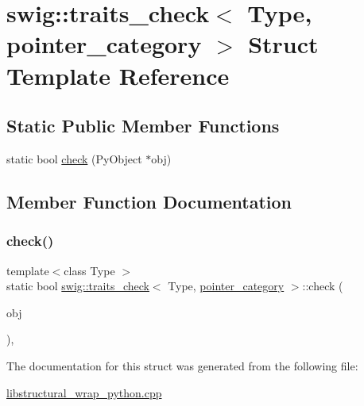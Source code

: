 \hypertarget{structswig_1_1traits__check_3_01_type_00_01pointer__category_01_4}{}\section{swig\+:\+:traits\+\_\+check$<$ Type, pointer\+\_\+category $>$ Struct Template Reference}
\label{structswig_1_1traits__check_3_01_type_00_01pointer__category_01_4}
\subsection*{Static Public Member Functions}
\begin{DoxyCompactItemize}
\item 
static bool \hyperlink{structswig_1_1traits__check_3_01_type_00_01pointer__category_01_4_ae3cc14b7411d171e1cf97aabd9ff92c5}{check} (Py\+Object $\ast$obj)
\end{DoxyCompactItemize}


\subsection{Member Function Documentation}
\mbox{\label{structswig_1_1traits__check_3_01_type_00_01pointer__category_01_4_ae3cc14b7411d171e1cf97aabd9ff92c5}} 
\subsubsection{\texorpdfstring{check()}{check()}}
{\footnotesize\ttfamily template$<$class Type $>$ \\
static bool \hyperlink{structswig_1_1traits__check}{swig\+::traits\+\_\+check}$<$ Type, \hyperlink{structswig_1_1pointer__category}{pointer\+\_\+category} $>$\+::check (\begin{DoxyParamCaption}\item[{Py\+Object $\ast$}]{obj }\end{DoxyParamCaption})\hspace{0.3cm}{\ttfamily [inline]}, {\ttfamily [static]}}



The documentation for this struct was generated from the following file\+:\begin{DoxyCompactItemize}
\item 
\hyperlink{libstructural__wrap__python_8cpp}{libstructural\+\_\+wrap\+\_\+python.\+cpp}\end{DoxyCompactItemize}
